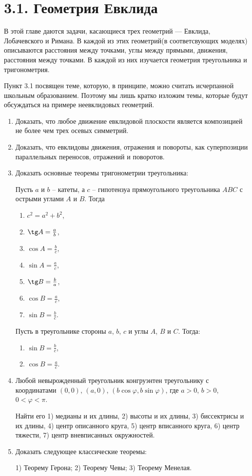 % 

% 

	\section{3.1. Геометрия Евклида}

	В этой главе даются задачи, касающиеся трех геометрий --- Евклида, Лобачевского и Римана. В каждой из этих геометрий(в соответсвующих моделях) описываются расстояния между точками, углы между прямыми, движения, расстояния между точками. В каждой из них изучается геометрия треугольника и тригонометрия.

	Пункт 3.1 посвящен теме, которую, в принципе, можно считать исчерпанной школьным образованием. Поэтому мы лишь кратко изложим темы, которые будут обсуждаться на примере неевклидовых геометрий.

	\begin{enumerate}
		\item Доказать, что любое движение евклидовой плоскости является композицией не более чем трех осевых симметрий.
		\item Доказать, что евклидовы движения, отражения и повороты, как суперпозиции параллельных переносов, отражений и поворотов.
		\item Доказать основные теоремы тригонометрии треугольника:

		Пусть $a$ и $b$ -- катеты, а $c$ -- гипотензуа прямоугольного треугольника $ABC$ с острыми углами $A$ и $B$. Тогда
		\begin{enumerate}
			\item $c^2 = a^2 + b^2$,
			\item $\tg A = \frac{a}{b}$,
			\item $\cos A = \frac{b}{c}$,
			\item $\sin A = \frac{a}{c}$,
			\item $\tg B = \frac{b}{a}$,
			\item $\cos B = \frac{a}{c}$,
			\item $\sin B = \frac{b}{c}$.
		\end{enumerate}

		Пусть в треугольнике стороны $a$, $b$, $c$ и углы $A$, $B$ и $C$. Тогда:
		\begin{enumerate}
			\item $\sin B = \frac{b}{c}$,
			\item $\cos B = \frac{a}{c}$.
		\end{enumerate}
		\item Любой невырожденный треугольник конгруэнтен треугольнику с координатами $(0,0)$, $(a,0)$, $(b\cos\varphi, b\sin\varphi)$, где $a>0$, $b>0$, $0<\varphi<\pi$.

		Найти его 1) медианы и их длины, 2) высоты и их длины, 3) биссектрисы и их длины, 4) центр описанного круга, 5) центр вписанного круга, 6) центр тяжести, 7) центр вневписанных окружностей.
		\item Доказать следующее классические теоремы:

		1) Теорему Герона; 2) Теорему Чевы; 3) Теорему Менелая.
	\end{enumerate}
